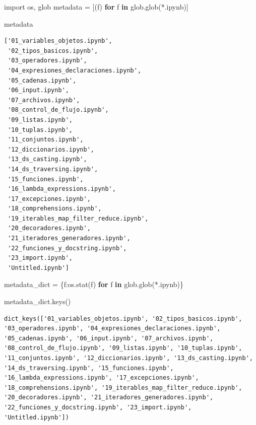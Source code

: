 \documentclass[
  spanish,
  letterpaper,
]{scrbook}
\newenvironment{Shaded}{\begin{snugshade}}{\end{snugshade}}
\newcommand{\ControlFlowTok}[1]{\textcolor[rgb]{0.00,0.23,0.31}{\textbf{#1}}}
\newcommand{\ImportTok}[1]{\textcolor[rgb]{0.00,0.46,0.62}{#1}}
\newcommand{\KeywordTok}[1]{\textcolor[rgb]{0.00,0.23,0.31}{\textbf{#1}}}
\newcommand{\NormalTok}[1]{\textcolor[rgb]{0.00,0.23,0.31}{#1}}
\newcommand{\OperatorTok}[1]{\textcolor[rgb]{0.37,0.37,0.37}{#1}}
\newcommand{\StringTok}[1]{\textcolor[rgb]{0.13,0.47,0.30}{#1}}
\theoremstyle{definition}
\theoremstyle{remark}
\begin{document}
\begin{Shaded}
\begin{Highlighting}[]
\ImportTok{import}\NormalTok{ os, glob}
\NormalTok{metadata }\OperatorTok{=}\NormalTok{ [(f) }\ControlFlowTok{for}\NormalTok{ f }\KeywordTok{in}\NormalTok{ glob.glob(}\StringTok{\textquotesingle{}*.ipynb\textquotesingle{}}\NormalTok{)]}

\NormalTok{metadata}
\end{Highlighting}
\end{Shaded}

\begin{verbatim}
['01_variables_objetos.ipynb',
 '02_tipos_basicos.ipynb',
 '03_operadores.ipynb',
 '04_expresiones_declaraciones.ipynb',
 '05_cadenas.ipynb',
 '06_input.ipynb',
 '07_archivos.ipynb',
 '08_control_de_flujo.ipynb',
 '09_listas.ipynb',
 '10_tuplas.ipynb',
 '11_conjuntos.ipynb',
 '12_diccionarios.ipynb',
 '13_ds_casting.ipynb',
 '14_ds_traversing.ipynb',
 '15_funciones.ipynb',
 '16_lambda_expressions.ipynb',
 '17_excepciones.ipynb',
 '18_comprehensions.ipynb',
 '19_iterables_map_filter_reduce.ipynb',
 '20_decoradores.ipynb',
 '21_iteradores_generadores.ipynb',
 '22_funciones_y_docstring.ipynb',
 '23_import.ipynb',
 'Untitled.ipynb']
\end{verbatim}

\begin{Shaded}
\begin{Highlighting}[]
\NormalTok{metadata\_dict }\OperatorTok{=}\NormalTok{ \{f:os.stat(f) }\ControlFlowTok{for}\NormalTok{ f }\KeywordTok{in}\NormalTok{ glob.glob(}\StringTok{\textquotesingle{}*.ipynb\textquotesingle{}}\NormalTok{)\}}
\end{Highlighting}
\end{Shaded}

\begin{Shaded}
\begin{Highlighting}[]
\NormalTok{metadata\_dict.keys()}
\end{Highlighting}
\end{Shaded}

\begin{verbatim}
dict_keys(['01_variables_objetos.ipynb', '02_tipos_basicos.ipynb', '03_operadores.ipynb', '04_expresiones_declaraciones.ipynb', '05_cadenas.ipynb', '06_input.ipynb', '07_archivos.ipynb', '08_control_de_flujo.ipynb', '09_listas.ipynb', '10_tuplas.ipynb', '11_conjuntos.ipynb', '12_diccionarios.ipynb', '13_ds_casting.ipynb', '14_ds_traversing.ipynb', '15_funciones.ipynb', '16_lambda_expressions.ipynb', '17_excepciones.ipynb', '18_comprehensions.ipynb', '19_iterables_map_filter_reduce.ipynb', '20_decoradores.ipynb', '21_iteradores_generadores.ipynb', '22_funciones_y_docstring.ipynb', '23_import.ipynb', 'Untitled.ipynb'])
\end{verbatim}
\end{document}
